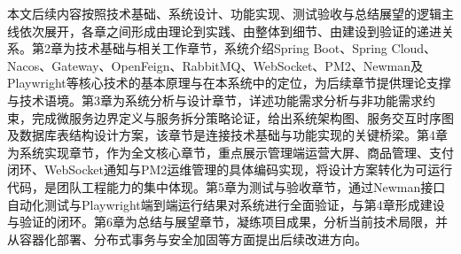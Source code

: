 本文后续内容按照技术基础、系统设计、功能实现、测试验收与总结展望的逻辑主线依次展开，各章之间形成由理论到实践、由整体到细节、由建设到验证的递进关系。第2章为技术基础与相关工作章节，系统介绍Spring Boot、Spring Cloud、Nacos、Gateway、OpenFeign、RabbitMQ、WebSocket、PM2、Newman及Playwright等核心技术的基本原理与在本系统中的定位，为后续章节提供理论支撑与技术语境。第3章为系统分析与设计章节，详述功能需求分析与非功能需求约束，完成微服务边界定义与服务拆分策略论证，给出系统架构图、服务交互时序图及数据库表结构设计方案，该章节是连接技术基础与功能实现的关键桥梁。第4章为系统实现章节，作为全文核心章节，重点展示管理端运营大屏、商品管理、支付闭环、WebSocket通知与PM2运维管理的具体编码实现，将设计方案转化为可运行代码，是团队工程能力的集中体现。第5章为测试与验收章节，通过Newman接口自动化测试与Playwright端到端运行结果对系统进行全面验证，与第4章形成建设与验证的闭环。第6章为总结与展望章节，凝练项目成果，分析当前技术局限，并从容器化部署、分布式事务与安全加固等方面提出后续改进方向。
